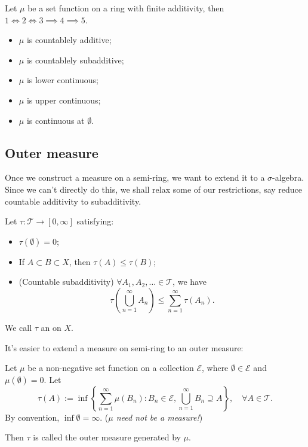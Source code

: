 \begin{theorem}
    Let $\mu$ be a set function on a ring with finite additivity,
	then $1\iff 2\iff 3\implies 4\implies 5$.
	\begin{itemize}
		\item $\mu$ is countablely additive;
		\item $\mu$ is countablely subadditive;
		\item $\mu$ is lower continuous;
		\item $\mu$ is upper continuous;
		\item $\mu$ is continuous at $\emptyset$.
	\end{itemize}
\end{theorem}

\subsection{Outer measure}
\label{sub:Outer measure}

Once we construct a measure on a semi-ring, we want to extend it
to a $\sigma$-algebra. Since we can't directly do this, we shall relax some of
our restrictions, say reduce countable additivity to subadditivity.

\begin{definition}
	Let $\tau: \mathscr{T}\to [0,\infty]$ satisfying:
	\begin{itemize}
		\item $\tau(\emptyset) = 0$;
		\item If  $A \subset B \subset X$, then $\tau(A)\le \tau(B)$;
		\item (Countable subadditivity) $\forall A_1,A_2,\dots\in \mathscr{T}$, we have
			\[
			\tau\left( \bigcup_{n=1}^\infty A_n \right)\le \sum_{n=1}^{\infty}\tau(A_n).
			\]
	\end{itemize}
	We call $\tau$ an  on $X$.
\end{definition}

It's easier to extend a measure on semi-ring to an outer measure:
\begin{theorem}
    Let $\mu$ be a non-negative set function on a collection  $\mathscr{E}$,
	where $\emptyset\in \mathscr{E}$ and $\mu(\emptyset)=0$.
	Let
	\[
	\tau(A) := \inf \left\{ \sum_{n=1}^{\infty} \mu(B_n): B_n\in \mathscr{E}, \bigcup_{n=1}^\infty B_n \supseteq A \right\}, \quad \forall A\in \mathscr{T}.
	\]
	By convention, $\inf \emptyset = \infty$.
	(\textit{$\mu$ need not be a measure!})

	Then $\tau$ is called the outer measure generated by $\mu$.
\end{theorem}

